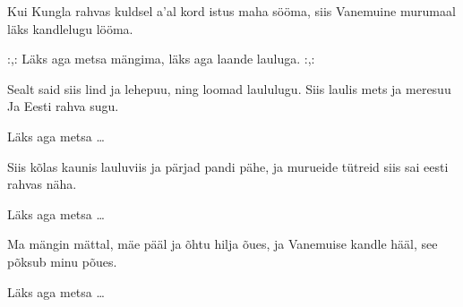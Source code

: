 Kui Kungla rahvas kuldsel a'al
kord istus maha s\"o\"oma,
siis Vanemuine murumaal
l\"aks kandlelugu l\"o\"oma.

:,: L\"aks aga metsa m\"angima,
l\"aks aga laande lauluga. :,:

Sealt said siis lind ja lehepuu,
ning loomad laululugu.
Siis laulis mets ja meresuu
Ja Eesti rahva sugu.

L\"aks aga metsa \ldots

Siis k\~olas kaunis lauluviis
ja p\"arjad pandi p\"ahe,
ja murueide t\"utreid siis
sai eesti rahvas n\"aha.

L\"aks aga metsa \ldots

Ma m\"angin m\"attal, m\"ae p\"a\"al
ja \~ohtu hilja \~oues,
ja Vanemuise kandle h\"a\"al,
see p\~oksub minu p\~oues.

L\"aks aga metsa \ldots
